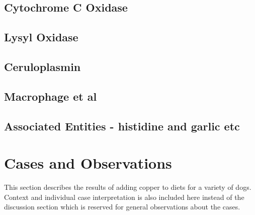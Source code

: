 \njnsitetab

\subsection{ Cytochrome C Oxidase  }

\mjmcox

\subsection{ Lysyl Oxidase  }

\mjmlox

\subsection{ Ceruloplasmin   }

\mjmcp

\subsection{ Macrophage et al   }

\mjmmacro

\subsection{ Associated Entities - histidine and garlic etc   }

\mjmlig



\section{Cases and Observations}

This section describes the results of adding
copper to diets for a variety of dogs. Context and
individual case interpretation is also included here instead of the
discussion section which is reserved for general observations
about the cases.  

\mjmdogsone


